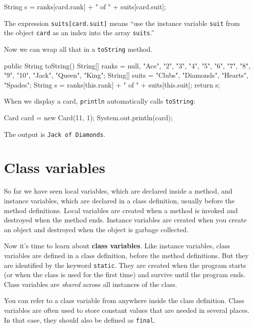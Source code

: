 \documentclass[12pt]{book}
\theoremstyle{exercise}
\newcommand{\java}[1]{\verb"#1"}
\begin{document}
\begin{code}
    String s = ranks[card.rank] + " of " + suits[card.suit];
\end{code}

The expression \java{suits[card.suit]} means ``use the instance variable \java{suit} from the object \java{card} as an index into the array \java{suits}.''

Now we can wrap all that in a \java{toString} method.

\begin{code}
public String toString() {
    String[] ranks = {null, "Ace", "2", "3", "4", "5", "6",
               "7", "8", "9", "10", "Jack", "Queen", "King"};
    String[] suits = {"Clubs", "Diamonds", "Hearts", "Spades"};
    String s = ranks[this.rank] + " of " + suits[this.suit];
    return s;
}
\end{code}

When we display a card, \java{println} automatically calls \java{toString}:

\begin{code}
    Card card = new Card(11, 1);
    System.out.println(card);
\end{code}

The output is {\tt Jack of Diamonds}.


\section{Class variables}
\label{classvar}

So far we have seen local variables, which are declared inside a method, and instance variables, which are declared in a class definition, usually before the method definitions.
Local variables are created when a method is invoked and destroyed when the method ends.
Instance variables are created when you create an object and destroyed when the object is garbage collected.


Now it's time to learn about {\bf class variables}.
Like instance variables, class variables are defined in a class definition, before the method definitions.
But they are identified by the keyword \java{static}.
They are created when the program starts (or when the class is used for the first time) and survive until the program ends.
Class variables are {\em shared} across all instances of the class.

You can refer to a class variable from anywhere inside the class definition.
Class variables are often used to store constant values that are needed in several places.
In that case, they should also be defined as \java{final}.
\end{document}
